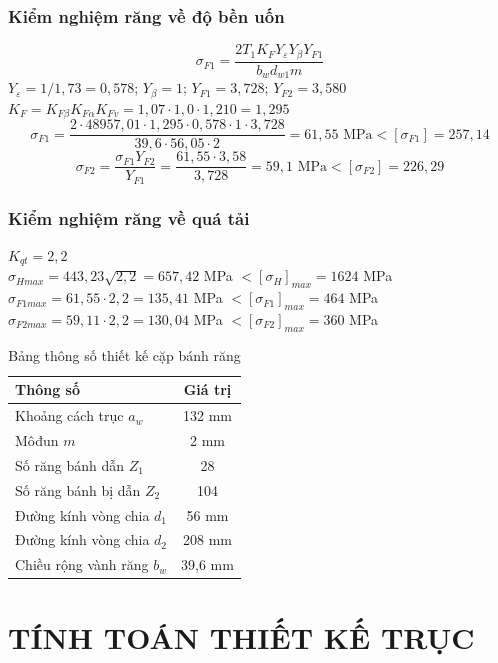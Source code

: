 \documentclass[12pt,a4paper]{report}
\begin{document}
\subsection{Kiểm nghiệm răng về độ bền uốn}
$$\sigma_{F1} = \frac{2T_1 K_F Y_\varepsilon Y_\beta Y_{F1}}{b_w d_{w1} m}$$
$Y_\varepsilon = 1/1{,}73 = 0{,}578$; $Y_\beta = 1$; $Y_{F1} = 3{,}728$; $Y_{F2} = 3{,}580$\\
$K_F = K_{F\beta} K_{F\alpha} K_{Fv} = 1{,}07 \cdot 1{,}0 \cdot 1{,}210 = 1{,}295$
$$\sigma_{F1} = \frac{2 \cdot 48957{,}01 \cdot 1{,}295 \cdot 0{,}578 \cdot 1 \cdot 3{,}728}{39{,}6 \cdot 56{,}05 \cdot 2} = 61{,}55 \text{ MPa} < [\sigma_{F1}] = 257{,}14$$
$$\sigma_{F2} = \frac{\sigma_{F1} Y_{F2}}{Y_{F1}} = \frac{61{,}55 \cdot 3{,}58}{3{,}728} = 59{,}1 \text{ MPa} < [\sigma_{F2}] = 226{,}29$$

\subsection{Kiểm nghiệm răng về quá tải}
$K_{qt} = 2{,}2$\\
$\sigma_{Hmax} = 443{,}23 \sqrt{2{,}2} = 657{,}42$ MPa $< [\sigma_H]_{max} = 1624$ MPa\\
$\sigma_{F1max} = 61{,}55 \cdot 2{,}2 = 135{,}41$ MPa $< [\sigma_{F1}]_{max} = 464$ MPa\\
$\sigma_{F2max} = 59{,}11 \cdot 2{,}2 = 130{,}04$ MPa $< [\sigma_{F2}]_{max} = 360$ MPa

\begin{table}[H]
    \centering
    \caption{Bảng thông số thiết kế cặp bánh răng}
    \label{tab:3.2}
    \begin{tabular}{|l|c|}
        \hline
        \textbf{Thông số} & \textbf{Giá trị} \\
        \hline
        Khoảng cách trục $a_w$ & 132 mm \\
        Môđun $m$ & 2 mm \\
        Số răng bánh dẫn $Z_1$ & 28 \\
        Số răng bánh bị dẫn $Z_2$ & 104 \\
        Đường kính vòng chia $d_1$ & 56 mm \\
        Đường kính vòng chia $d_2$ & 208 mm \\
        Chiều rộng vành răng $b_w$ & 39,6 mm \\
        \hline
    \end{tabular}
\end{table}

\chapter{TÍNH TOÁN THIẾT KẾ TRỤC}
\end{document}
